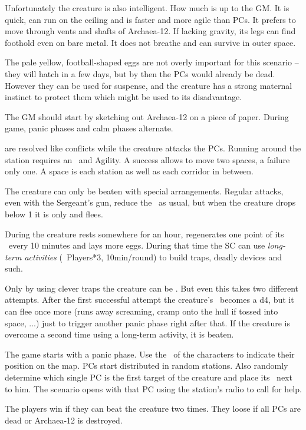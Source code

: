 {		Unfortunately the creature is also intelligent. How much is up to the GM. It is quick, can run on the ceiling and is faster and more agile than PCs. It prefers to move through vents and shafts of Archaea-12. If lacking gravity, its legs can find foothold even on bare metal. It does not breathe and can survive in outer space.

		The pale yellow, football-shaped eggs are not overly important for this scenario -- they will hatch in a few days, but by then the PCs would already be dead. However they can be used for suspense, and the creature has a strong maternal instinct to protect them which might be used to its disadvantage.


		\noindent
		The GM should start by sketching out Archaea-12 on a piece of paper. During game, panic phases and calm phases alternate.

		 are resolved like conflicts while the creature attacks the PCs. Running around the station requires an \AD~and Agility. A success allows to move two spaces, a failure only one. A space is each station as well as each corridor in between.

		The creature can only be beaten with special arrangements. Regular attacks, even with the Sergeant's gun, reduce the \HD\ as usual, but when the creature drops below 1 it is only  and flees.

		During  the creature rests somewhere for an hour, regenerates one point of its \HD\ every 10 minutes and lays more eggs. During that time the SC can use \emph{long-term activities} (\TN~Players*3, 10min/round) to build traps, deadly devices and such.

		Only by using clever traps the creature can be . But even this takes two different attempts. After the first successful attempt the creature's \HD~becomes a d4, but it can flee once more (runs away screaming, cramp onto the hull if tossed into space, ...) just to trigger another panic phase right after that. If the creature is overcome a second time using a long-term activity, it is beaten.

		The game starts with a panic phase. Use the \HD\ of the characters to indicate their position on the map. PCs start distributed in random stations. Also randomly determine which single PC is the first target of the creature and place its \HD\ next to him. The scenario opens with that PC using the station's radio to call for help.


		\noindent
		The players win if they can beat the creature two times. They loose if all PCs are dead or Archaea-12 is destroyed.

}
